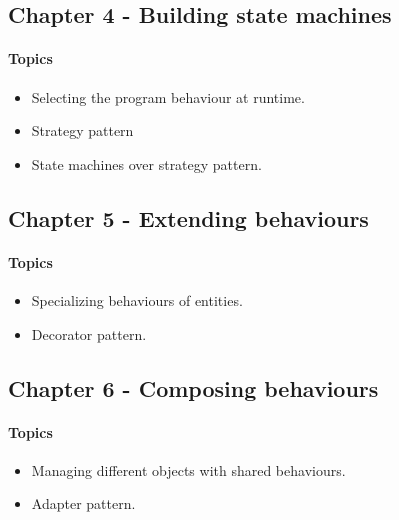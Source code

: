 \subsection{Chapter 4 - Building state machines}
\paragraph*{Topics}			
\begin{itemize}
	\item Selecting the program behaviour at runtime.
	\item Strategy pattern
	\item State machines over strategy pattern.
\end{itemize}

\subsection{Chapter 5 - Extending behaviours}
\paragraph*{Topics}			
\begin{itemize}
	\item Specializing behaviours of entities.
	\item Decorator pattern.
\end{itemize}

\subsection{Chapter 6 - Composing behaviours}
\paragraph*{Topics}			
\begin{itemize}
	\item Managing different objects with shared behaviours.
	\item Adapter pattern.
\end{itemize}
